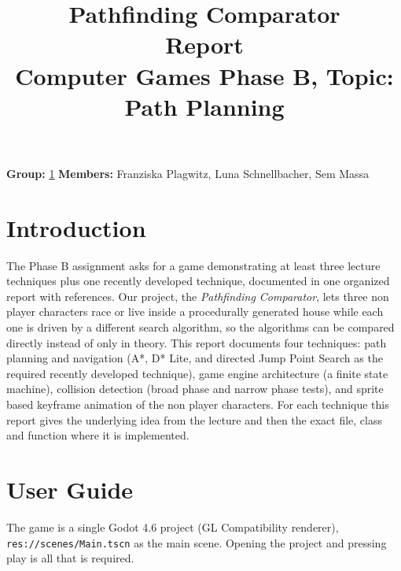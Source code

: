 \documentclass[11pt,a4paper]{article}
\title{\Huge\textbf{Pathfinding Comparator}\\[0.3em]
\Large Report\\[0.2em]
\large Computer Games \textendash{} Phase B, Topic: Path Planning}
\author{}
\date{}
\begin{document}
\maketitle
\thispagestyle{fancy}

\noindent
\textbf{Group:} \underline{1} \qquad
\textbf{Members:} Franziska Plagwitz, Luna Schnellbacher, Sem Massa

\vspace{1em}

\section*{Introduction}

The Phase B assignment asks for a game demonstrating at least three lecture techniques plus one recently developed technique, documented in one organized report with references. Our project, the \emph{Pathfinding Comparator}, lets three non player characters race or live inside a procedurally generated house while each one is driven by a different search algorithm, so the algorithms can be compared directly instead of only in theory. This report documents four techniques: path planning and navigation (A*, D* Lite, and directed Jump Point Search as the required recently developed technique), game engine architecture (a finite state machine), collision detection (broad phase and narrow phase tests), and sprite based keyframe animation of the non player characters. For each technique this report gives the underlying idea from the lecture and then the exact file, class and function where it is implemented.

\section{User Guide}

The game is a single Godot 4.6 project (GL Compatibility renderer), \texttt{res://scenes/Main.tscn} as the main scene. Opening the project and pressing play is all that is required.
\end{document}
